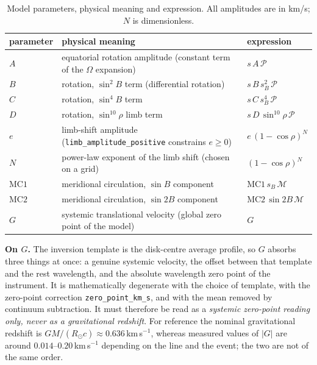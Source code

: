 \documentclass[11pt,a4paper]{article}
\newcommand{\code}[1]{\texttt{\small #1}}
\newcommand{\Rsun}{R_{\odot}}
\newcommand{\Proj}{\mathcal{P}}
\newcommand{\Merid}{\mathcal{M}}
\begin{document}
\begin{table}[htbp]
\centering
\small
\caption{Model parameters, physical meaning and expression.  All amplitudes are
in km/s; $N$ is dimensionless.}
\label{tab:terms}
\begin{tabular}{@{}lll@{}}
\toprule
parameter & physical meaning & expression \\
\midrule
$A$ & equatorial rotation amplitude (constant term of the $\Omega$ expansion)
    & $s\,A\,\Proj$ \\
$B$ & rotation, $\sin^2 B$ term (differential rotation)
    & $s\,B\,s_B^{2}\,\Proj$ \\
$C$ & rotation, $\sin^4 B$ term
    & $s\,C\,s_B^{4}\,\Proj$ \\
$D$ & rotation, $\sin^{10}\!\rho$ limb term
    & $s\,D\,\sin^{10}\!\rho\,\Proj$ \\
$e$ & limb-shift amplitude (\code{limb\_amplitude\_positive} constrains $e\ge0$)
    & $e\,(1-\cos\rho)^{N}$ \\
$N$ & power-law exponent of the limb shift (chosen on a grid)
    & $(1-\cos\rho)^{N}$ \\
$\mathrm{MC1}$ & meridional circulation, $\sin B$ component
    & $\mathrm{MC1}\,s_B\,\Merid$ \\
$\mathrm{MC2}$ & meridional circulation, $\sin 2B$ component
    & $\mathrm{MC2}\,\sin 2B\,\Merid$ \\
$G$ & systemic translational velocity (global zero point of the model)
    & $G$ \\
\bottomrule
\end{tabular}
\end{table}

\noindent
\textbf{On $G$.}  The inversion template is the disk-centre average profile, so
$G$ absorbs three things at once: a genuine systemic velocity, the offset
between that template and the rest wavelength, and the absolute wavelength zero
point of the instrument.  It is mathematically degenerate with the choice of
template, with the zero-point correction \code{zero\_point\_km\_s}, and with the
mean removed by continuum subtraction.  It must therefore be read as a
\emph{systemic zero-point reading only, never as a gravitational redshift}.  For
reference the nominal gravitational redshift is
$GM/(\Rsun c) \approx 0.636$\,km\,s$^{-1}$, whereas measured values of $|G|$ are
around $0.014$--$0.20$\,km\,s$^{-1}$ depending on the line and the event; the two
are not of the same order.
\end{document}
